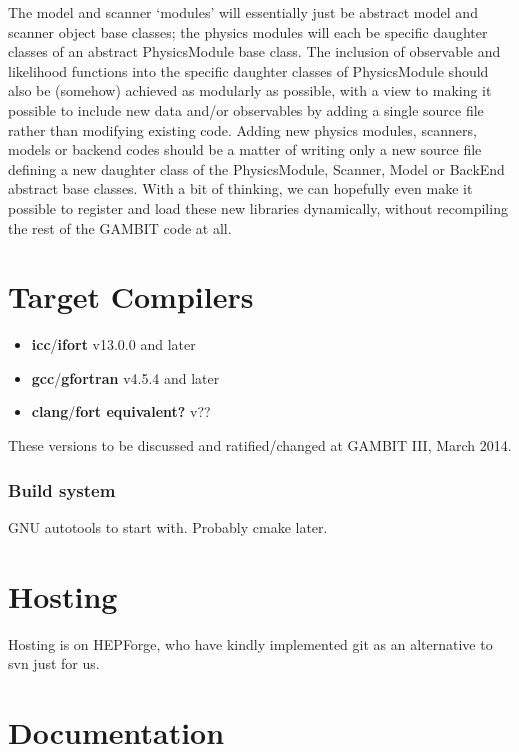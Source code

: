 The model and scanner `modules' will essentially just be abstract model and scanner object base classes; the physics modules will each be specific daughter classes of an abstract PhysicsModule base class.  The inclusion of observable and likelihood functions into the specific daughter classes of PhysicsModule should also be (somehow) achieved as modularly as possible, with a view to making it possible to include new data and/or observables by adding a single source file rather than modifying existing code.  Adding new physics modules, scanners, models or backend codes should be a matter of writing only a new source file defining a new daughter class of the PhysicsModule, Scanner, Model or BackEnd abstract base classes.  With a bit of thinking, we can hopefully even make it possible to register and load these new libraries dynamically, without recompiling the rest of the GAMBIT code at all.

\section{Target Compilers}

\begin{itemize}
\item[]\textbf{icc}/\textbf{ifort} v13.0.0 and later
\item[]\textbf{gcc}/\textbf{gfortran} v4.5.4 and later
\item[]\textbf{clang}/\textbf{fort equivalent?} v??
\end{itemize}

These versions to be discussed and ratified/changed at GAMBIT III, March 2014.

\subsubsection{Build system}

GNU autotools to start with.  Probably cmake later.

\section{Hosting}

Hosting is on HEPForge, who have kindly implemented git as an alternative to svn just for us.

\section{Documentation}

